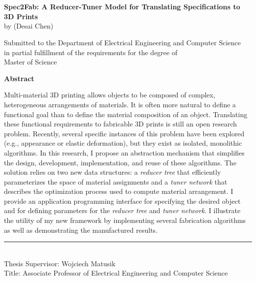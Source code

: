 \chapter*{}
\label{chap:abstract}
\begin{center}
\vspace{-8em}
{\large \textsf{\textbf{Spec2Fab: A Reducer-Tuner Model for Translating Specifications to 3D Prints}}} \\
by (Desai Chen)

\vspace{.2in}

Submitted to the Department of Electrical Engineering and Computer Science \\
in partial fulfillment of the requirements for the degree of \\
Master of Science \\ %
\end{center}

\noindent\textsf{\textbf{Abstract}}

\noindent Multi-material 3D printing allows objects to be composed of complex, heterogeneous arrangements of materials. It is often more natural to define a functional goal than to define the material composition of an object. Translating these functional requirements to fabricable 3D prints is still an open research problem. Recently, several specific instances of this problem have been explored (e.g.,  appearance or elastic deformation), but they exist as isolated, monolithic algorithms. In this research, I propose an abstraction mechanism that simplifies the design, development, implementation, and reuse of these algorithms. The solution relies on two new data structures: a \emph{reducer tree} that efficiently parameterizes the space of material assignments and a \emph{tuner network} that describes the optimization process used to compute material arrangement. I provide an application programming interface for specifying the desired object and for defining parameters for the \emph{reducer tree} and \emph{tuner network}. I illustrate the utility of my new framework by implementing several fabrication algorithms as well as demonstrating the manufactured results.

\noindent\rule[0.5ex]{2in}{1pt} \\
Thesis Supervisor: Wojciech Matusik\\
Title:  Associate Professor of Electrical Engineering and Computer Science



